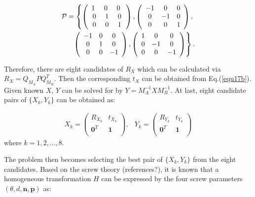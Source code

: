 \documentclass[letterpaper, 10 pt, conference]{ieeeconf}  %
\begin{document}
\begin{equation}\label{equ19}
\begin{split}
{\cal P} = \left\{ \left(\begin{array}{ccc}
1\,\, & 0 \,\, & 0 \,\, \\
0 & 1 & 0\\
0 & 0 & 1 \end{array}\right) , \left(\begin{array}{ccc}
-1 & 0 & 0 \\
0 & -1 & 0\\
0 & 0 & 1 \end{array}\right), \right.\\
\left. \left(\begin{array}{ccc}
-1 & 0 & 0 \\
0 & 1 & 0\\
0 & 0 & -1 \end{array}\right), \left(\begin{array}{ccc}
1 & 0 & 0 \\
0 & -1 & 0\\
0 & 0 & -1 \end{array}\right)\right\}.
\end{split}
\end{equation}

Therefore, there are eight candidates of $R_{X}$ which can be calculated via $R_{X}=Q_{M_{A}}PQ_{M_{B}}^T$. Then the corresponding $t_{X}$ can be obtained  from Eq.(\ref{equ17b}). Given known $X$, $Y$ can be solved for by $Y = M_A^{-1}XM_B^{-1}$. At last, eight candidate pairs of  $\{X_{k},Y_{k}\}$ can be obtained as:

\begin{equation}\label{equ20}
\begin{array}{cc}
X_{k}= \left( \begin{array}{cc}
       R_{X_k} & t_{X_k} \\
       \mathbf{0}^{T} & \mathbf{1}\\
\end{array} \right),&
Y_{k}= \left( \begin{array}{cc}
       R_{Y_k} & t_{Y_k} \\
       \mathbf{0}^{T} & \mathbf{1}\\
\end{array} \right)
\end{array}
\end{equation}
where $k = 1,2,...,8$.

The problem then becomes selecting the best pair of $\{X_k, Y_k\}$ from the eight candidates.
Based on the screw theory (references?), it is known that a homogeneous transformation $H$ can be expressed by the four screw parameters $(\theta,d,\mathbf{n},\mathbf{p})$ as:
\end{document}
